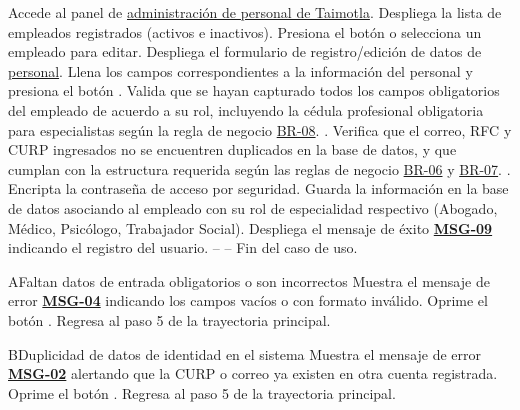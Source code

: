  \begin{UCtrayectoria}
 	\UCpaso[\UCactor] Accede al panel de \hyperlink{IU24}{administración de personal de Taimotla}.
 	\UCpaso Despliega la lista de empleados registrados (activos e inactivos).
 	\UCpaso[\UCactor] Presiona el botón  o selecciona un empleado para editar.
 	\UCpaso Despliega el formulario de registro/edición de datos de \hyperlink{Personal}{personal}.
 	\UCpaso[\UCactor] Llena los campos correspondientes a la información del personal y presiona el botón .
 	\UCpaso Valida que se hayan capturado todos los campos obligatorios del empleado de acuerdo a su rol, incluyendo la cédula profesional obligatoria para especialistas según la regla de negocio \hyperlink{BR-08}{BR-08}. .
 	\UCpaso Verifica que el correo, RFC y CURP ingresados no se encuentren duplicados en la base de datos, y que cumplan con la estructura requerida según las reglas de negocio \hyperlink{BR-06}{BR-06} y \hyperlink{BR-07}{BR-07}. .
 	\UCpaso Encripta la contraseña de acceso por seguridad.
 	\UCpaso Guarda la información en la base de datos asociando al empleado con su rol de especialidad respectivo (Abogado, Médico, Psicólogo, Trabajador Social).
 	\UCpaso Despliega el mensaje de éxito \hyperlink{mMSG09}{\bf MSG-09} indicando el registro del usuario.
 	\UCpaso[] -- -- Fin del caso de uso.
 \end{UCtrayectoria}

\begin{UCtrayectoriaA}{A}{Faltan datos de entrada obligatorios o son incorrectos}
	\UCpaso Muestra el mensaje de error \hyperlink{mMSG04}{\bf MSG-04} indicando los campos vacíos o con formato inválido.
	\UCpaso[\UCactor] Oprime el botón .
	\UCpaso Regresa al paso 5 de la trayectoria principal.
\end{UCtrayectoriaA}

\begin{UCtrayectoriaA}{B}{Duplicidad de datos de identidad en el sistema}
	\UCpaso Muestra el mensaje de error \hyperlink{mMSG02}{\bf MSG-02} alertando que la CURP o correo ya existen en otra cuenta registrada.
	\UCpaso[\UCactor] Oprime el botón .
	\UCpaso Regresa al paso 5 de la trayectoria principal.
\end{UCtrayectoriaA}
